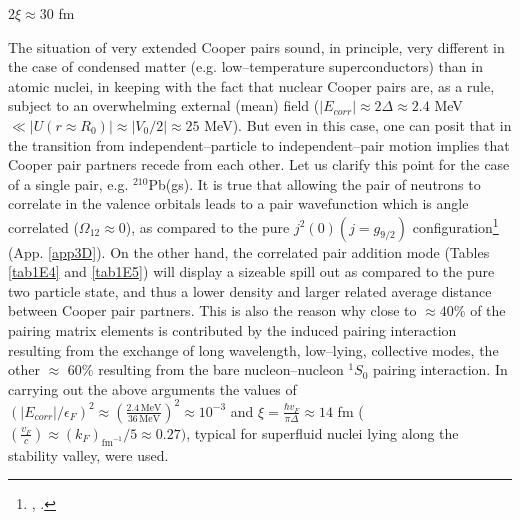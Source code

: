 $2\xi\approx30$ fm

The situation of very extended Cooper pairs sound, in principle, very different in the case of condensed matter (e.g. low--temperature superconductors) than in atomic nuclei, in keeping with the fact that nuclear Cooper pairs are, as a rule, subject to an overwhelming external (mean) field ($|E_{corr}|\approx 2\Delta\approx2.4$ MeV $\ll |U(r\approx R_0)|\approx |V_0/2|\approx 25 $ MeV). But even in this case, one can posit that in the transition from independent--particle to independent--pair motion implies that Cooper pair partners recede from each other. Let us clarify this point for the case of a single pair, e.g. $^{210}$Pb(gs). It is true that allowing the pair of neutrons to correlate in the valence orbitals leads to a pair wavefunction which is angle correlated ($\Omega_{12}\approx 0$), as compared to the pure $j^2(0)(j=g_{9/2})$ configuration\footnote{\cite{Bertsch:67}, \cite{Ferreira:84,Matsuo:13}.} (App. \ref{app3D}). On the other hand, the correlated pair addition mode (Tables \ref{tab1E4} and \ref{tab1E5}) will display a sizeable spill out as compared to the pure two particle state, and thus a lower density and larger related average distance between Cooper pair partners. This is also the reason why close to $\approx 40$\% of the pairing matrix elements is contributed by the induced pairing interaction resulting from the exchange of long wavelength, low--lying, collective modes, the other $\approx$ 60\% resulting from the bare nucleon--nucleon $^1S_0$ pairing interaction. In carrying out the above arguments the values of $(|E_{corr}|/\epsilon_F)^2\approx \left(\frac{2.4 \,\text{MeV}}{36\,\text{MeV}}\right)^2\approx 10^{-3}$ and $\xi=\frac{\hbar v_F}{\pi\Delta}\approx 14$ fm ($(\frac{v_F}{c})\approx (k_F)_{\text{fm}^{-1}}/5\approx 0.27)$, typical for superfluid nuclei lying along the stability valley, were used.


